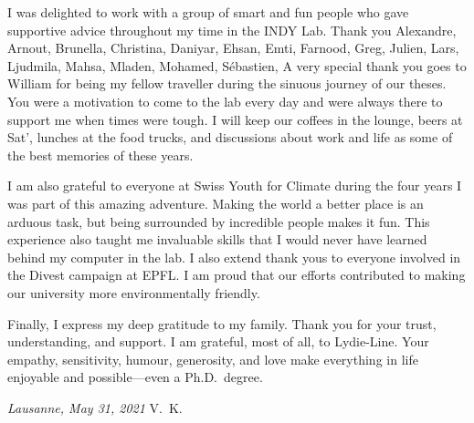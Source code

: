 I was delighted to work with a group of smart and fun people who gave supportive advice throughout my time in the INDY Lab.
Thank you
Alexandre,
Arnout,
Brunella,
Christina,
Daniyar,
Ehsan,
Emti,
Farnood,
Greg,
Julien,
Lars,
Ljudmila,
Mahsa,
Mladen,
Mohamed,
Sébastien,
A very special thank you goes to William for being my fellow traveller during the sinuous journey of our theses.
You were a motivation to come to the lab every day and were always there to support me when times were tough.
I will keep our coffees in the lounge, beers at Sat', lunches at the food trucks, and discussions about work and life as some of the best memories of these years.

I am also grateful to everyone at Swiss Youth for Climate during the four years I was part of this amazing adventure.
Making the world a better place is an arduous task, but being surrounded by incredible people makes it fun.
This experience also taught me invaluable skills that I would never have learned behind my computer in the lab.
I also extend thank yous to everyone involved in the Divest campaign at EPFL.
I am proud that our efforts contributed to making our university more environmentally friendly.

Finally, I express my deep gratitude to my family.
Thank you for your trust, understanding, and support.
I am grateful, most of all, to Lydie-Line.
Your empathy, sensitivity, humour, generosity, and love make everything in life enjoyable and possible---even a Ph.D.\ degree.

\bigskip

\noindent\textit{Lausanne, May 31, 2021}
\hfill V.~K.
